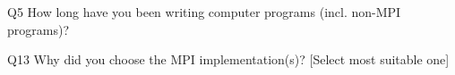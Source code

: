 \begin{description}%
\item{Q5} How long have you been writing computer programs (incl. non-MPI programs)?%
\item{Q13} Why did you choose the MPI implementation(s)? [Select most suitable one]%
\end{description}%
